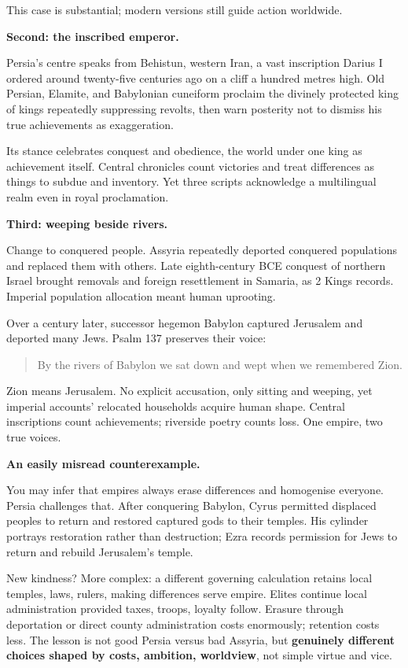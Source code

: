 This case is substantial; modern versions still guide action worldwide.

\textbf{Second: the inscribed emperor.}

Persia's centre speaks from Behistun, western Iran, a vast inscription Darius I ordered around twenty-five centuries ago on a cliff a hundred metres high. Old Persian, Elamite, and Babylonian cuneiform proclaim the divinely protected king of kings repeatedly suppressing revolts, then warn posterity not to dismiss his true achievements as exaggeration.

Its stance celebrates conquest and obedience, the world under one king as achievement itself. Central chronicles count victories and treat differences as things to subdue and inventory. Yet three scripts acknowledge a multilingual realm even in royal proclamation.

\textbf{Third: weeping beside rivers.}

Change to conquered people. Assyria repeatedly deported conquered populations and replaced them with others. Late eighth-century BCE conquest of northern Israel brought removals and foreign resettlement in Samaria, as 2 Kings records. Imperial population allocation meant human uprooting.

Over a century later, successor hegemon Babylon captured Jerusalem and deported many Jews. Psalm 137 preserves their voice:

\begin{quote}
By the rivers of Babylon we sat down and wept when we remembered Zion.
\end{quote}
Zion means Jerusalem. No explicit accusation, only sitting and weeping, yet imperial accounts' relocated households acquire human shape. Central inscriptions count achievements; riverside poetry counts loss. One empire, two true voices.

\textbf{An easily misread counterexample.}

You may infer that empires always erase differences and homogenise everyone. Persia challenges that. After conquering Babylon, Cyrus permitted displaced peoples to return and restored captured gods to their temples. His cylinder portrays restoration rather than destruction; Ezra records permission for Jews to return and rebuild Jerusalem's temple.

New kindness? More complex: a different governing calculation retains local temples, laws, rulers, making differences serve empire. Elites continue local administration provided taxes, troops, loyalty follow. Erasure through deportation or direct county administration costs enormously; retention costs less. The lesson is not good Persia versus bad Assyria, but \textbf{genuinely different choices shaped by costs, ambition, worldview}, not simple virtue and vice.

